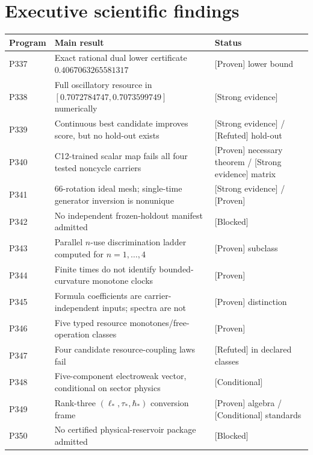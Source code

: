 \documentclass[11pt,a4paper,openany]{report}
\newcommand{\statusProven}{\textcolor{fingreen}{[Proven]}}
\newcommand{\statusStrong}{\textcolor{finblue}{[Strong evidence]}}
\newcommand{\statusRefuted}{\textcolor{finred}{[Refuted]}}
\begin{document}
\chapter{Executive scientific findings}

\begin{center}
\begingroup\small
\setlength{\tabcolsep}{2.5pt}
\renewcommand{\arraystretch}{1.16}
\begin{longtable}{@{}p{}p{}p{}@{}}
\toprule
\textbf{Program} & \textbf{Main result} & \textbf{Status} \\
\midrule
\endhead
P337 & Exact rational dual lower certificate \(0.4067063265581317\) & \statusProven{} lower bound \\
P338 & Full oscillatory resource in \([0.7072784747,0.7073599749]\) numerically & \statusStrong{} \\
P339 & Continuous best candidate improves score, but no hold-out exists & \statusStrong{} /\allowbreak{} \statusRefuted{} hold-out \\
P340 & C12-trained scalar map fails all four tested noncycle carriers & \statusProven{} necessary theorem /\allowbreak{} \statusStrong{} matrix \\
P341 & 66-rotation ideal mesh; single-time generator inversion is nonunique & \statusStrong{} /\allowbreak{} \statusProven{} \\
P342 & No independent frozen-holdout manifest admitted & [Blocked] \\
P343 & Parallel \(n\)-use discrimination ladder computed for \(n=1,\ldots,4\) & \statusProven{} subclass \\
P344 & Finite times do not identify bounded-curvature monotone clocks & \statusProven{} \\
P345 & Formula coefficients are carrier-independent inputs; spectra are not & \statusProven{} distinction \\
P346 & Five typed resource monotones/\allowbreak{}free-operation classes & \statusProven{} \\
P347 & Four candidate resource-coupling laws fail & \statusRefuted{} in declared classes \\
P348 & Five-component electroweak vector, conditional on sector physics & [Conditional] \\
P349 & Rank-three \((\ell_*,\tau_*,\hbar_*)\) conversion frame & \statusProven{} algebra /\allowbreak{} [Conditional] standards \\
P350 & No certified physical-reservoir package admitted & [Blocked] \\
\bottomrule
\end{longtable}
\endgroup
\end{center}
\end{document}

